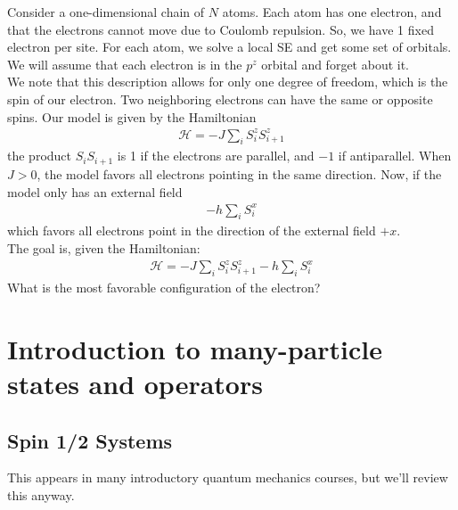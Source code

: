 \documentclass{book}
\theoremstyle{definition}
\newcommand{\had}{\mathcal{H}}
\begin{document}
Consider a one-dimensional chain of $N$ atoms. Each atom has one electron, and that the electrons cannot move due to Coulomb repulsion. So, we have 1 fixed electron per site. For each atom, we solve a local SE and get some set of orbitals. \\

We will assume that each electron is in the $p^z$ orbital and forget about it. \\

We note that this description allows for only one degree of freedom, which is the spin of our electron. Two neighboring electrons can have the same or opposite spins. Our model is given by the Hamiltonian
\begin{align}
\had = -J \sum_i S_i^z S_{i+1}^z
\end{align}
the product $S_iS_{i+1}$ is 1 if the electrons are parallel, and $-1$ if antiparallel. When $J > 0$, the model favors all electrons pointing in the same direction. Now, if the model only has an external field
\begin{align}
-h \sum_i S_i^x
\end{align}
which favors all electrons point in the direction of the external field $+x$. \\

The goal is, given the Hamiltonian:
\begin{align}
\had = -J \sum_i S^z_i S^z_{i+1} - h \sum_i S^x_i
\end{align}
What is the most favorable configuration of the electron?


















\section{Introduction to many-particle states and operators}

\subsection{Spin 1/2 Systems} 

This appears in many introductory quantum mechanics courses, but we'll review this anyway. \\
\end{document}
